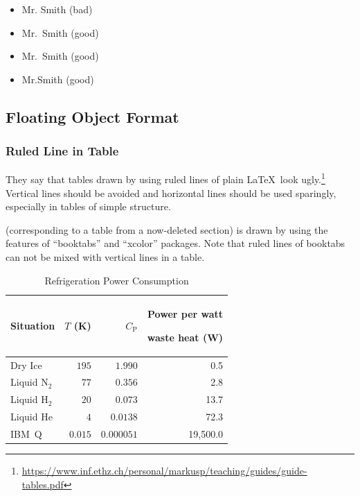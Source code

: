 \begin{itemize}[nosep]
	\item Mr. Smith (bad)
	\item Mr.~Smith (good)
	\item Mr.\ Smith (good)
	\item Mr.\@ Smith (good)
\end{itemize}

\subsection{Floating Object Format}
\label{sec:app:styleguide:Floating Object Format}

\subsubsection{Ruled Line in Table}
\label{sec:app:styleguide:Ruled Line in Table}

They say that tables drawn by using ruled lines of plain \LaTeX\
look ugly.\footnote{
  \url{https://www.inf.ethz.ch/personal/markusp/teaching/guides/guide-tables.pdf}
}
Vertical lines should be avoided and horizontal lines should be
used sparingly, especially in tables of simple structure.


\newcommand{\TLo}{T_\mathrm{L}}
\newcommand{\THi}{T_\mathrm{H}}
\newcommand{\CPf}{C_\mathrm{P}}

(corresponding to a table from a now-deleted section)
is drawn by using the features of ``booktabs'' and ``xcolor'' packages.
Note that ruled lines of booktabs can not be mixed with
vertical lines in a table.

\begin{table}
\renewcommand*{\arraystretch}{1.2}\centering\small
\begin{tabular}{lrrr}\toprule
Situation
	& $T$ (K)
		& $\CPf$ & \parbox[b]{.75in}{\raggedleft Power per watt\par waste heat (W)} \\
\midrule
Dry Ice
	& $195$
		& $1.990$
			& 0.5 \\
Liquid N$_2$
	& $77$
		& $0.356$
			& 2.8 \\
Liquid H$_2$
	& $20$
		& $0.073$
			& 13.7 \\
Liquid He
	& $4$
		& $0.0138$
			& 72.3 \\
IBM~Q	& $0.015$
		& $0.000051$
			& 19,500.0 \\
\bottomrule
\end{tabular}
\caption{Refrigeration Power Consumption}
\label{tab:app:styleguide:Refrigeration Power Consumption}
\end{table}

